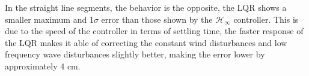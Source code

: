In the straight line segments, the behavior is the opposite, the LQR shows a smaller maximum and 1$\sigma$ error than those shown by the $\mathcal{H}_\infty$ controller. This is due to the speed of the controller in terms of settling time, the faster response of the LQR makes it able of correcting the constant wind disturbances and low frequency wave disturbances slightly better, making the error lower by approximately 4 cm.